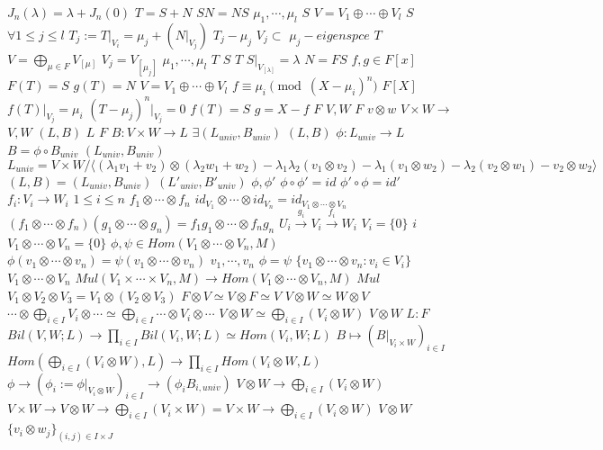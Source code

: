 \documentclass{article}
\begin{document}
$J_n(\lambda)=\lambda+J_n(0)$
$T=S+N$
$SN=NS$
$\mu_1,\cdots,\mu_l$
$S$
$V=V_1 \oplus \cdots \oplus V_l$
$S$
$\forall 1 \leq j \leq l$
$T_j:=T|_{V_i}=\mu_j+(N|_{V_j})$
$T_j-\mu_j$
$V_j \subset$
$\mu_j-eigenspce$
$T$
$V=\bigoplus_{\mu \in F}V_{[\mu]}$
$V_j=V_{[\mu_j]}$
$\mu_1,\cdots,\mu_l$
$T$
$S$
$T$
$S|_{V_{[\lambda]}}=\lambda$
$N=FS$
$f,g \in F[x]$
$F(T)=S$
$g(T)=N$
$V=V_1 \oplus \cdots \oplus V_l$
$f \equiv \mu_i \pmod{(X-\mu_i)^n}$
$F[X]$
$f(T)|_{V_{j}}=\mu_i$
$(T-\mu_j)^n|_{V_j}=0$
$f(T)=S$
$g=X-f$
$F$
$V,W$
$F$
$v \otimes w$
$V \times W \rightarrow$
$V,W$
$(L,B)$
$L$
$F$
$B:V \times W \rightarrow L$
$\exists(L_{univ},B_{univ})$
$(L,B)$
$\phi:L_{univ} \rightarrow L$
$B=\phi \circ B_{univ}$
$(L_{univ},B_{univ})$
$$L_{univ}=V \times W/ \langle (\lambda_1v_1+v_2) \otimes (\lambda_2w_1 +w_2)-\lambda_1\lambda_2(v_1 \otimes v_2)-\lambda_1(v_1 \otimes w_2)-\lambda_2(v_2 \otimes w_1)-v_2 \otimes w_2 \rangle$$
$(L,B)=(L_{univ},B_{univ})$
$(L'_{univ},B'_{univ})$
$\phi,\phi'$
$\phi \circ\phi'=id$
$\phi' \circ \phi=id'$
$f_i:V_i \rightarrow W_i$
$1 \leq i \leq n$
$f_1 \otimes \cdots \otimes f_n$
$id_{V_1} \otimes \cdots \otimes id_{V_n}=id_{V_1\otimes\cdots\otimes V_n}$
$(f_1 \otimes \cdots \otimes f_n)(g_1\otimes\cdots\otimes g_n)=f_1g_1\otimes\cdots\otimes f_ng_n$
$U_i \stackrel{g_i}{\longrightarrow} V_i \stackrel{f_i}{\longrightarrow} W_i$
$V_i=\{0\}$
$i$
$V_1 \otimes \cdots \otimes V_n =\{0\}$
$\phi,\psi \in Hom(V_1 \otimes \cdots \otimes V_n,M)$
$\phi(v_1\otimes\cdots\otimes v_n)=\psi(v_1\otimes\cdots\otimes v_n)$
$v_1,\cdots,v_n$
$\phi=\psi$
$\{v_1\otimes\cdots\otimes v_n:v_i \in V_i\}$
$V_1\otimes\cdots\otimes V_n$
$Mul(V_1 \times \cdots \times V_n,M) \rightarrow Hom(V_1\otimes\cdots\otimes V_n,M)$
$Mul$
$V_1 \otimes V_2 \otimes V_3=V_1 \otimes (V_2 \otimes V_3)$
$F \otimes V \simeq V \otimes F \simeq V$
$V \otimes W \simeq W \otimes V$
$\cdots \otimes \bigoplus_{i \in I}V_i \otimes \cdots \simeq \bigoplus_{i \in I} \cdots \otimes V_i \otimes \cdots$
$V \otimes W \simeq \bigoplus_{i \in I} (V_i \otimes W)$
$V \otimes W$
$L:F$
$Bil(V,W;L) \rightarrow \prod_{i \in I}Bil(V_i,W;L) \simeq Hom(V_i,W;L)$
$B \mapsto (B|_{V_i \times W})_{i \in I}$
$Hom(\bigoplus_{i \in I}(V_i \otimes W),L) \rightarrow \prod_{i \in I}Hom(V_i \otimes W,L)$
$\phi \rightarrow(\phi_i:=\phi|_{V_i \otimes W})_{i \in I} \rightarrow (\phi_iB_{i,univ})$
$V \otimes W \rightarrow \bigoplus_{i \in I}(V_i \otimes W)$
$V \times W \rightarrow V \otimes W \rightarrow \bigoplus_{i \in I}(V_i \times W)=V \times W \rightarrow \bigoplus_{i \in I}(V_i \otimes W)$
$V \otimes W$
$\{v_i \otimes w_j\}_{(i,j) \in I \times J}$
\end{document}
